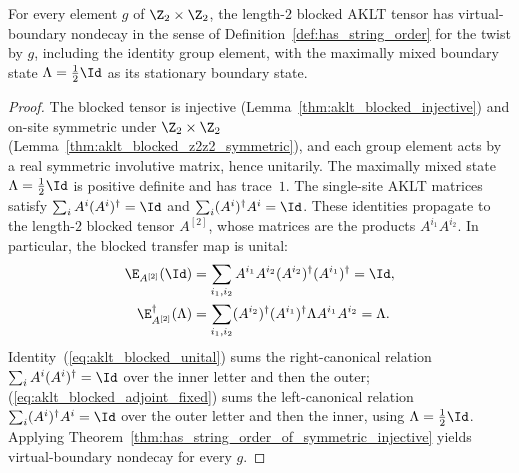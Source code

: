 \begin{lemma}\label{thm:aklt_string_order}
    \leanok
    For every element $g$ of $\Z_2 \times \Z_2$, the length-$2$ blocked AKLT
    tensor has virtual-boundary nondecay in the sense of
    Definition~\ref{def:has_string_order} for the twist by $g$, including the
    identity group element, with the
    maximally mixed boundary state $\Lambda = \tfrac{1}{2}\Id$ as its stationary
    boundary state.
\end{lemma}
\begin{proof}
    \leanok
    The blocked tensor is injective (Lemma~\ref{thm:aklt_blocked_injective}) and
    on-site symmetric under $\Z_2 \times \Z_2$
    (Lemma~\ref{thm:aklt_blocked_z2z2_symmetric}), and each group element acts
    by a real symmetric involutive matrix, hence unitarily. The maximally mixed
    state $\Lambda = \tfrac{1}{2}\Id$ is positive definite and has trace~$1$.
    The single-site AKLT matrices satisfy
    $\sum_i A^i(A^i)^\dagger = \Id$ and
    $\sum_i (A^i)^\dagger A^i = \Id$. These identities propagate to the
    length-$2$ blocked tensor $A^{[2]}$, whose matrices are the products
    $A^{i_1}A^{i_2}$. In particular, the blocked transfer map is unital:
    \begin{align}
        \E_{A^{[2]}}(\Id)
         & = \sum_{i_1,i_2}
        A^{i_1}A^{i_2}(A^{i_2})^\dagger(A^{i_1})^\dagger
        = \Id,
        \label{eq:aklt_blocked_unital} \\
        \E_{A^{[2]}}^\dagger(\Lambda)
         & = \sum_{i_1,i_2}
        (A^{i_2})^\dagger(A^{i_1})^\dagger
        \Lambda A^{i_1}A^{i_2}
        = \Lambda.
        \label{eq:aklt_blocked_adjoint_fixed}
    \end{align}
    Identity~(\ref{eq:aklt_blocked_unital}) sums the right-canonical relation
    $\sum_i A^i(A^i)^\dagger = \Id$ over the inner letter and then the outer;
    (\ref{eq:aklt_blocked_adjoint_fixed}) sums the left-canonical relation
    $\sum_i (A^i)^\dagger A^i = \Id$ over the outer letter and then the inner,
    using $\Lambda = \tfrac{1}{2}\Id$. Applying
    Theorem~\ref{thm:has_string_order_of_symmetric_injective} yields virtual-boundary
    nondecay for every $g$.
\end{proof}

